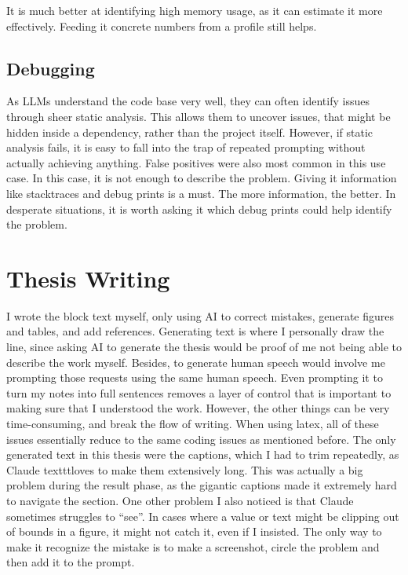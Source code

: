 It is much better at identifying high memory usage, as it can estimate it more effectively.
Feeding it concrete numbers from a profile still helps.

\subsection{Debugging}

As LLMs understand the code base very well, they can often identify issues through sheer static analysis.
This allows them to uncover issues, that might be hidden inside a dependency, rather than the project itself.
However, if static analysis fails, it is easy to fall into the trap of repeated prompting without actually achieving anything.
False positives were also most common in this use case.
In this case, it is not enough to describe the problem.
Giving it information like stacktraces and debug prints is a must.
The more information, the better.
In desperate situations, it is worth asking it which debug prints could help identify the problem.

\section{Thesis Writing}

I wrote the block text myself, only using AI to correct mistakes, generate figures and tables, and add references.
Generating text is where I personally draw the line, since asking AI to generate the thesis would be proof of me not being able to describe the work myself.
Besides, to generate human speech would involve me prompting those requests using the same human speech.
Even prompting it to turn my notes into full sentences removes a layer of control that is important to making sure that I understood the work.
However, the other things can be very time-consuming, and break the flow of writing.
When using latex, all of these issues essentially reduce to the same coding issues as mentioned before.
The only generated text in this thesis were the captions, which I had to trim repeatedly, as Claude texttt{loves} to make them extensively long.
This was actually a big problem during the result phase, as the gigantic captions made it extremely hard to navigate the section.
One other problem I also noticed is that Claude sometimes struggles to ``see''.
In cases where a value or text might be clipping out of bounds in a figure, it might not catch it, even if I insisted.
The only way to make it recognize the mistake is to make a screenshot, circle the problem and then add it to the prompt.